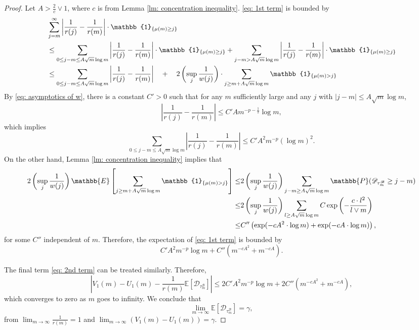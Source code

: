 \documentclass[EJP]{ejpecp} %
\newcommand{\abs}[1]{\left\vert #1 \right\vert}
\begin{document}
\begin{proof}
	Let $A> \frac{2}{c} \vee 1$, where $c$ is from Lemma \ref{lm: concentration inequality}. \eqref{eq: 1st term} is bounded by
	\begin{align*}
		& \sum_{j=m}^{\infty} \abs{\frac{1}{r(j)} -\frac{1}{r(m)} } \cdot \mathbb{1}_{\left\{\mu(m)\geq j \right\}}\\
		& \leq  \sum_{0\leq j-m \leq A \sqrt{m}\log m } \abs{\frac{1}{r(j)} -\frac{1}{r(m)} } \cdot \mathbb{1}_{\left\{\mu(m)\geq j \right\}}
		+  \sum_{j-m > A\sqrt{m}\log m } \abs{\frac{1}{r(j)} -\frac{1}{r(m)} } \cdot \mathbb{1}_{\left\{\mu(m)\geq j \right\}}
		\notag
		\\
		&\leq  \sum_{0\leq j-m \leq A\sqrt{m}\log m } \abs{\frac{1}{r(j)} -\frac{1}{r(m)} }
		\quad +\quad 2\left(\sup_j \frac{1}{w(j)}\right) \cdot \sum_{j\geq m + A\sqrt{m}\log m } \mathbb{1}_{\left\{ \mu(m) > j \right\}}
		\label{eq: low large difference}
	\end{align*}
	By \eqref{eq: asymptotics of w}, there is a constant $C'>0$ such that for any $m$ sufficiently large and any $j$ with $\abs{j-m}\leq A \sqrt m \log m $, 
	\[ \abs{\frac{1}{r(j)} -\frac{1}{r(m)} } \leq C' A m^{-p-\frac{1}{2}} \log m, \]
	which implies
	\[
	\sum_{0\leq j-m \leq A\sqrt{m}\log m } \abs{\frac{1}{r(j)} -\frac{1}{r(m)} } \le 
	C' A^2 m^{-p} (\log m)^2.
	\] On the other hand, Lemma \ref{lm: concentration inequality} implies that
	\begin{align*}
		2\left(\sup_j \frac{1}{w(j)}\right) \mathbb{E}\left[\sum_{j\geq m + A\sqrt{m}\log m } \mathbb{1}_{\left\{ \mu(m) > j \right\}} \right]
		\le & 2\left(\sup_j \frac{1}{w(j)}\right) \sum_{j-m \geq A \sqrt m \log m  } \mathbb{P}( \mathscr{D}_{\tau^{\mathscr{B}}_m} \geq j-m )  
		\notag 
		\\
		\leq& 2\left(\sup_j \frac{1}{w(j)}\right) \sum_{l \geq A \sqrt m \log m } C \exp\left( - \frac{c  \cdot l^2}{l \vee m}   \right)
		\notag\\
		\leq& C'' \left( \exp (- cA^2 \cdot \log m ) + \exp(-cA \cdot \log m) \right), 
	\end{align*} for some $C''$ independent of $m$. Therefore, the expectation of \eqref{eq: 1st term} is bounded by
	\begin{equation}\label{eq: boound}
		C' A^2 m^{-p} \log m + C''  \left( m ^{-cA^2} +  m^{-cA} \right). 
	\end{equation}

	The final term \eqref{eq: 2nd term} can be treated similarly. Therefore,
	$$ \abs{ V_1(m)- U_1(m) -\frac{1}{r(m)}\mathbb{E}\left[ \mathscr{D}_{\tau^{\mathscr{B}}_m} \right] }
	\leq 2C' A^2 m^{-p} \log m + 2C''  \left( m ^{-cA^2} +  m^{-cA} \right), 
	$$ 
	which converges to zero as $m$ goes to infinity. We conclude that 
	\[
	\lim_{m\to\infty}\mathbb{E}\left[ \mathscr{D}_{\tau^{\mathscr{B}}_m} \right] = \gamma, 
	\] 
	from $\lim_{m\to\infty}\frac{1}{r(m)} =1$ and $ \lim_{m\to \infty} \left(V_1(m)-U_1(m) \right) = \gamma$.
\end{proof}
\end{document}

